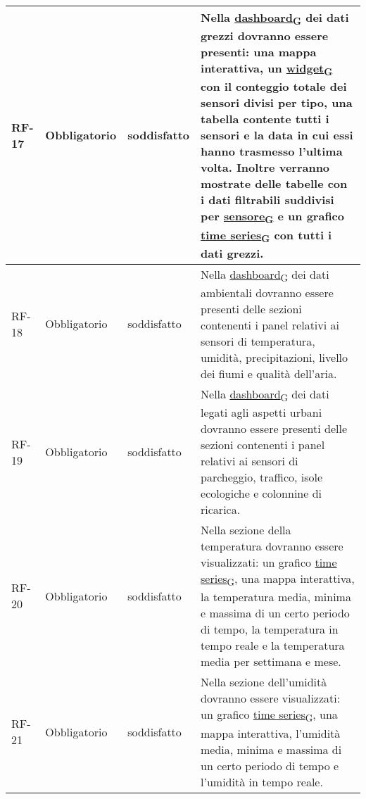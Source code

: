 \begin{longtable}{|>{\centering\arraybackslash}m{}|>{\centering\arraybackslash}m{}|>{\centering\arraybackslash}m{}|>{\centering\arraybackslash}m{}|}
	RF-17           & Obbligatorio        & soddisfatto                                                                                                           & Nella \href{https://7last.github.io/docs/pb/documentazione-interna/glossario\#dashboard}{dashboard\textsubscript{G}} dei dati grezzi dovranno essere presenti: una mappa interattiva, un \href{https://7last.github.io/docs/pb/documentazione-interna/glossario\#widget}{widget\textsubscript{G}} con il conteggio totale dei sensori divisi per tipo, una tabella contente tutti i sensori e la data in cui essi hanno trasmesso l'ultima volta. Inoltre verranno mostrate delle tabelle con i dati filtrabili suddivisi per \href{https://7last.github.io/docs/pb/documentazione-interna/glossario\#sensore}{sensore\textsubscript{G}} e un grafico \href{https://7last.github.io/docs/pb/documentazione-interna/glossario\#time-series}{time series\textsubscript{G}} con tutti i dati grezzi.
	\\\hline
	RF-18           & Obbligatorio        & soddisfatto                                                                                                           & Nella \href{https://7last.github.io/docs/pb/documentazione-interna/glossario\#dashboard}{dashboard\textsubscript{G}} dei dati ambientali dovranno essere presenti delle sezioni contenenti i panel relativi ai sensori di temperatura, umidità, precipitazioni, livello dei fiumi e qualità dell'aria.
	\\\hline
	RF-19           & Obbligatorio        & soddisfatto                                                                                                           & Nella \href{https://7last.github.io/docs/pb/documentazione-interna/glossario\#dashboard}{dashboard\textsubscript{G}} dei dati legati agli aspetti urbani dovranno essere presenti delle sezioni contenenti i panel relativi ai sensori di parcheggio, traffico, isole ecologiche e colonnine di ricarica.
	\\\hline
	RF-20           & Obbligatorio        & soddisfatto                                                                                                           & Nella sezione della temperatura dovranno essere visualizzati: un grafico \href{https://7last.github.io/docs/pb/documentazione-interna/glossario\#time-series}{time series\textsubscript{G}}, una mappa interattiva, la temperatura media, minima e massima di un certo periodo di tempo, la temperatura in tempo reale e la temperatura media per settimana e mese.
	\\\hline
	RF-21           & Obbligatorio        & soddisfatto                                                                                                           & Nella sezione dell'umidità dovranno essere visualizzati: un grafico \href{https://7last.github.io/docs/pb/documentazione-interna/glossario\#time-series}{time series\textsubscript{G}}, una mappa interattiva, l'umidità media, minima e massima di un certo periodo di tempo e l'umidità in tempo reale.

\end{longtable}
